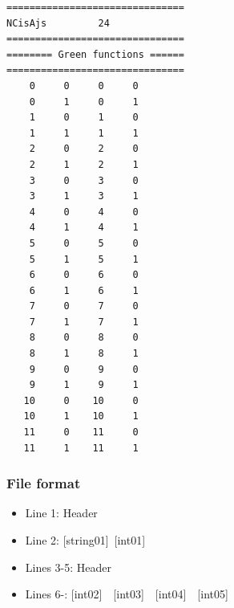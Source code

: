 \begin{minipage}{12.5cm}
\begin{screen}
\begin{verbatim}
===============================
NCisAjs         24
===============================
======== Green functions ======
===============================
    0     0     0     0
    0     1     0     1
    1     0     1     0
    1     1     1     1
    2     0     2     0
    2     1     2     1
    3     0     3     0
    3     1     3     1
    4     0     4     0
    4     1     4     1
    5     0     5     0
    5     1     5     1
    6     0     6     0
    6     1     6     1
    7     0     7     0
    7     1     7     1
    8     0     8     0
    8     1     8     1
    9     0     9     0
    9     1     9     1
   10     0    10     0
   10     1    10     1
   11     0    11     0
   11     1    11     1
\end{verbatim}
\end{screen}
\end{minipage}

\subsubsection{File format}
 \begin{itemize}
   \item  Line 1:  Header
   \item  Line 2:   [string01]~[int01]
   \item  Lines 3-5:  Header
   \item  Lines 6-: 
  [int02]~~[int03]~~[int04]~~[int05]
  \end{itemize}

